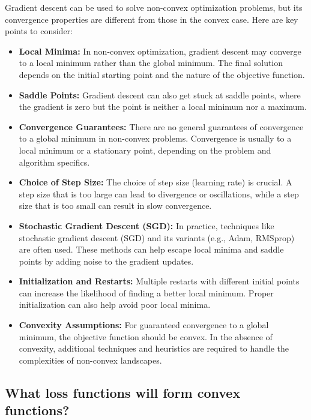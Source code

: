 Gradient descent can be used to solve non-convex optimization problems, but its convergence properties are different from those in the convex case. Here are key points to consider:

\begin{itemize}
  \item \textbf{Local Minima:} In non-convex optimization, gradient descent may converge to a local minimum rather than the global minimum. The final solution depends on the initial starting point and the nature of the objective function.

  \item \textbf{Saddle Points:} Gradient descent can also get stuck at saddle points, where the gradient is zero but the point is neither a local minimum nor a maximum.

  \item \textbf{Convergence Guarantees:} There are no general guarantees of convergence to a global minimum in non-convex problems. Convergence is usually to a local minimum or a stationary point, depending on the problem and algorithm specifics.

  \item \textbf{Choice of Step Size:} The choice of step size (learning rate) is crucial. A step size that is too large can lead to divergence or oscillations, while a step size that is too small can result in slow convergence.

  \item \textbf{Stochastic Gradient Descent (SGD):} In practice, techniques like stochastic gradient descent (SGD) and its variants (e.g., Adam, RMSprop) are often used. These methods can help escape local minima and saddle points by adding noise to the gradient updates.

  \item \textbf{Initialization and Restarts:} Multiple restarts with different initial points can increase the likelihood of finding a better local minimum. Proper initialization can also help avoid poor local minima.

  \item \textbf{Convexity Assumptions:} For guaranteed convergence to a global minimum, the objective function should be convex. In the absence of convexity, additional techniques and heuristics are required to handle the complexities of non-convex landscapes.
\end{itemize}


\subsection{What loss functions will form convex functions?}


